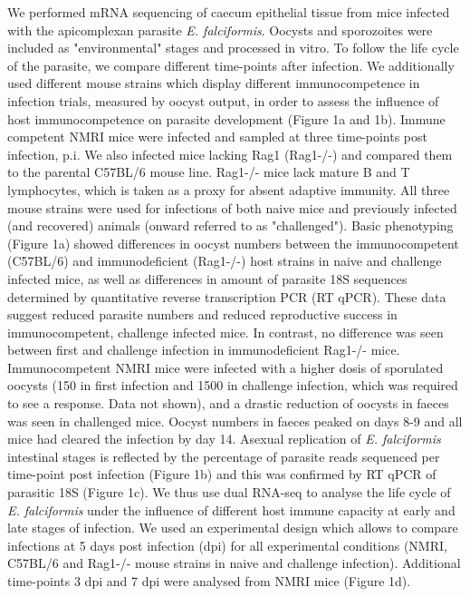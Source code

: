 \documentclass{bmcart}
\begin{document}
We performed mRNA sequencing of caecum epithelial tissue from mice infected with
the apicomplexan parasite \textit{E. falciformis}. Oocysts and
sporozoites were included as "environmental" stages and processed
in vitro. To follow the life cycle of the parasite, we
compare different time-points after infection. We additionally used different mouse strains which display different immunocompetence in infection trials, measured by oocyst output, in order to assess the influence of host immunocompetence on parasite development (Figure 1a and 1b). Immune competent NMRI mice were infected and sampled at three time-points post infection, p.i. We also infected mice lacking Rag1 (Rag1-/-) and compared them to the parental C57BL/6 mouse line. Rag1-/- mice lack mature B and T lymphocytes, which is taken as a proxy for absent adaptive immunity. All three mouse strains were used for infections of both naive mice and previously infected (and recovered) animals (onward referred to as "challenged").
Basic phenotyping (Figure 1a) showed differences in oocyst numbers between the immunocompetent (C57BL/6) and immunodeficient (Rag1-/-) host strains in naive and challenge infected mice, as well as differences in amount of parasite 18S sequences determined by quantitative reverse transcription PCR (RT qPCR). These data suggest reduced parasite numbers and reduced reproductive success in immunocompetent, challenge infected mice. In contrast, no difference was seen between first and challenge infection in immunodeficient Rag1-/- mice. Immunocompetent NMRI mice were infected with a higher dosis of sporulated oocysts (150 in first infection and 1500 in challenge infection, which was required to see a response. Data not shown), and a drastic reduction of oocysts in faeces was seen in challenged mice. Oocyst numbers in faeces peaked on days 8-9 and all mice had cleared the infection by day 14. Asexual replication of \textit{E. falciformis} intestinal stages is reflected by the percentage of parasite reads sequenced per time-point post infection (Figure 1b) and this was confirmed by RT qPCR of parasitic 18S (Figure 1c).
We thus use dual RNA-seq to analyse the life cycle of \textit{E. falciformis} under the influence of different host immune capacity at early and late stages of infection. We used an experimental design which allows to compare infections at 5 days post infection (dpi) for all experimental conditions (NMRI, C57BL/6 and Rag1-/- mouse strains in naive and challenge infection). Additional time-points 3 dpi and 7 dpi were analysed from NMRI mice (Figure 1d).
\end{document}
